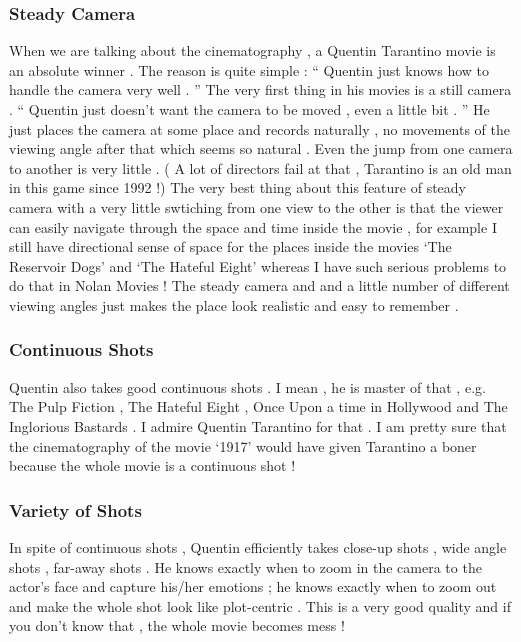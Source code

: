 \documentclass[14pt]{article}
\begin{document}
		\subsubsection{Steady Camera}
			When we are talking about the cinematography , a Quentin Tarantino movie is an absolute winner . The reason is quite simple : `` Quentin just knows how to handle the camera very well . '' The very first thing in his movies is a still camera . `` Quentin just doesn't want the camera to be moved , even a little bit . '' He just places the camera at some place and records naturally , no movements of the viewing angle after that which seems so natural . Even the jump from one camera to another is very little . ( A lot of directors fail at that , Tarantino is an old man in this game since 1992 !) The very best thing about this feature of steady camera with a very little swtiching from one view to the other is that the viewer can easily navigate through the space and time inside the movie , for example I still have directional sense of space for the places inside the movies `The Reservoir Dogs' and `The Hateful Eight' whereas I have such serious problems to do that in Nolan Movies ! The steady camera and and a little number of different viewing angles just makes the place look realistic and easy to remember .
		\subsubsection{Continuous Shots}
			Quentin also takes good continuous shots . I mean , he is master of that , e.g. The Pulp Fiction , The Hateful Eight , Once Upon a time in Hollywood and The Inglorious Bastards . I admire Quentin Tarantino for that . I am pretty sure that the cinematography of the movie `1917' would have given Tarantino a boner because the whole movie is a continuous shot ! 
		\subsubsection{Variety of Shots}
			In spite of continuous shots , Quentin efficiently takes close-up shots , wide angle shots , far-away shots . He knows exactly when to zoom in the camera to the actor's face and capture his/her emotions ; he knows exactly when to zoom out and make the whole shot look like plot-centric . This is a very good quality and if you don't know that , the whole movie becomes mess !
\end{document}
